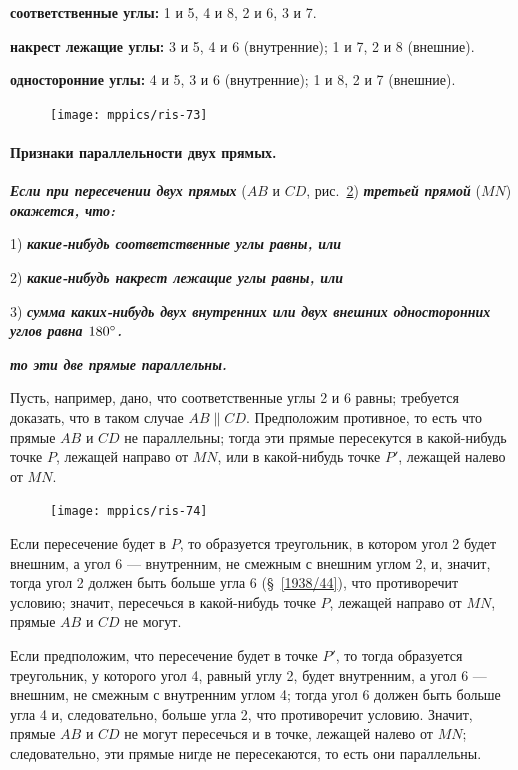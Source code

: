 \textbf{соответственные углы:}
1 и 5, 4 и 8, 2 и 6, 3 и 7.

\textbf{накрест лежащие углы:}
3 и 5, 4 и 6 (внутренние);
1 и 7, 2 и 8 (внешние).

\textbf{односторонние углы:}
4 и 5, 3 и 6 (внутренние);
1 и 8, 2 и 7 (внешние).

\begin{figure}
\vskip-6mm
\centering
\texttt{[image: mppics/ris-73]}
\caption{}\label{1938/ris-73}
\end{figure}

\paragraph{Признаки параллельности двух прямых.}\label{1938/73}
\textbf{\emph{Если при пересечении двух прямых}} ($AB$ и $CD$, рис.~\ref{1938/ris-74}) \textbf{\emph{третьей прямой}} ($MN$) \textbf{\emph{окажется, что:}}

1) \textbf{\emph{какие-нибудь соответственные углы равны, или}}

2) \textbf{\emph{какие-нибудь накрест лежащие углы равны, или}}

3) \textbf{\emph{сумма каких-нибудь двух внутренних или двух внешних односторонних углов равна $180\degree$.}}

\noindent\textbf{\emph{то эти две прямые параллельны.}}

Пусть, например, дано, что соответственные углы 2 и 6 равны;
требуется доказать, что в таком случае $AB \parallel CD$.
Предположим противное, то есть что прямые $AB$ и $CD$ не параллельны;
тогда эти прямые пересекутся в какой-нибудь точке $P$, лежащей направо от $MN$, или в какой-нибудь точке $P'$, лежащей налево от $MN$.

\begin{figure}[h!]
\centering
\texttt{[image: mppics/ris-74]}
\caption{}\label{1938/ris-74}
\end{figure}

Если пересечение будет в $P$, то образуется треугольник, в котором угол 2 будет внешним, а угол 6 — внутренним, не смежным с внешним углом 2, и, значит, тогда угол 2 должен быть больше угла 6 (§~\ref{1938/44}), что противоречит условию;
значит, пересечься в какой-нибудь точке $P$, лежащей направо от $MN$, прямые $AB$ и $CD$ не могут.

Если предположим, что пересечение будет в точке $P'$, то тогда образуется треугольник, у которого угол 4, равный углу 2, будет внутренним, а угол 6 — внешним, не смежным с внутренним углом 4;
тогда угол 6 должен быть больше угла 4 и, следовательно, больше угла 2, что противоречит условию.
Значит, прямые $AB$ и $CD$ не могут пересечься и в точке, лежащей налево от $MN$;
следовательно, эти прямые нигде не пересекаются, то есть они параллельны.


